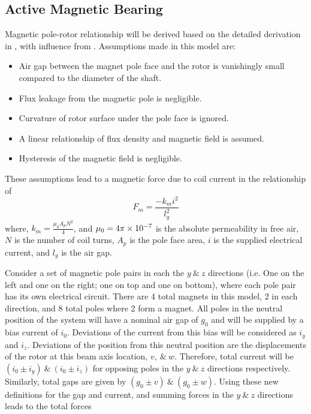 \subsection{Active Magnetic Bearing}\label{Active Magnetic Bearing}
Magnetic pole-rotor relationship will be derived based on the detailed derivation in \cite{das2008vibration}, with influence from \cite{childs1993turbomachinery}. Assumptions made in this model are:
\begin{itemize}
	\item Air gap between the magnet pole face and the rotor is vanishingly small compared to the diameter of the shaft.\
	\item Flux leakage from the magnetic pole is negligible.
	\item Curvature of rotor surface under the pole face is ignored.
	\item A linear relationship of flux density and magnetic field is assumed.
	\item Hysteresis of the magnetic field is negligible.
\end{itemize}
These assumptions lead to a magnetic force due to coil current in the relationship of
\begin{equation}\label{key}
F_m=\frac{-k_mi^2}{l_g^2}
\end{equation}
where, $ k_m=\frac{\mu_0A_pN^2}{4} $, and $ \mu_0=4\pi\times 10^{-7} $ is the absolute permeability in free air, $ N $ is the number of coil turns, $ A_p $ is the pole face area, $ i $ is the supplied electrical current, and $ l_g $ is the air gap.\par 
Consider a set of magnetic pole pairs in each the $ y\ \&\ z $ directions (i.e. One on the left and one on the right; one on top and one on bottom), where each pole pair has its own electrical circuit. There are 4 total magnets in this model, 2 in each direction, and 8 total poles where 2 form a magnet. All poles in the neutral position of the system will have a nominal air gap of $ g_0 $ and will be supplied by a bias current of $ i_0 $. Deviations of the current from this bias will be considered as $ i_y $ and $ i_z $. Deviations of the position from this neutral position are the displacements of the rotor at this beam axis location, $ v,\ \&\ w $. Therefore, total current will be $ (i_0\pm i_y)\ \&\ (i_0\pm i_z) $ for opposing poles in the $ y\ \&\ z $ directions respectively. Similarly, total gaps are given by $ (g_0\pm v)\ \&\ (g_0\pm w) $. Using these new definitions for the gap and current, and summing forces in the $ y\ \&\ z $ directions leads to the total forces
